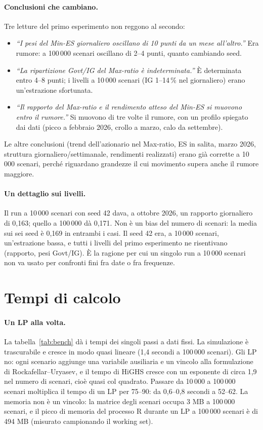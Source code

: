 \documentclass[11pt,a4paper]{article}
\begin{document}
\paragraph{Conclusioni che cambiano.} Tre letture del primo esperimento non reggono al secondo:
\begin{itemize}
\item \emph{``I pesi del Min-ES giornaliero oscillano di 10 punti da un mese all'altro.''} Era rumore: a 100\,000 scenari oscillano di 2--4 punti, quanto cambiando seed.
\item \emph{``La ripartizione Govt/IG del Max-ratio \`e indeterminata.''} \`E determinata entro 4--8 punti; i livelli a 10\,000 scenari (IG 1--14\,\% nel giornaliero) erano un'estrazione sfortunata.
\item \emph{``Il rapporto del Max-ratio e il rendimento atteso del Min-ES si muovono entro il rumore.''} Si muovono di tre volte il rumore, con un profilo spiegato dai dati (picco a febbraio 2026, crollo a marzo, calo da settembre).
\end{itemize}
Le altre conclusioni (trend dell'azionario nel Max-ratio, ES in salita, marzo 2026, struttura giornaliero/settimanale, rendimenti realizzati) erano gi\`a corrette a 10\,000 scenari, perch\'e riguardano grandezze il cui movimento supera anche il rumore maggiore.

\paragraph{Un dettaglio sui livelli.} Il run a 10\,000 scenari con seed 42 dava, a ottobre 2026, un rapporto giornaliero di 0,163; quello a 100\,000 d\`a 0,171. Non \`e un bias del numero di scenari: la media sui sei seed \`e 0,169 in entrambi i casi. Il seed 42 era, a 10\,000 scenari, un'estrazione bassa, e tutti i livelli del primo esperimento ne risentivano (rapporto, pesi Govt/IG). \`E la ragione per cui un singolo run a 10\,000 scenari non va usato per confronti fini fra date o fra frequenze.

\section{Tempi di calcolo}
\label{sec:perf}

\paragraph{Un LP alla volta.} La tabella~\ref{tab:bench} d\`a i tempi dei singoli passi a dati fissi. La simulazione \`e trascurabile e cresce in modo quasi lineare (1,4 secondi a 100\,000 scenari). Gli LP no: ogni scenario aggiunge una variabile ausiliaria e un vincolo alla formulazione di Rockafellar--Uryasev, e il tempo di HiGHS cresce con un esponente di circa 1,9 nel numero di scenari, cio\`e quasi col quadrato. Passare da 10\,000 a 100\,000 scenari moltiplica il tempo di un LP per 75--90: da 0,6--0,8 secondi a 52--62. La memoria non \`e un vincolo: la matrice degli scenari occupa 3 MB a 100\,000 scenari, e il picco di memoria del processo R durante un LP a 100\,000 scenari \`e di 494 MB (misurato campionando il working set).
\end{document}
